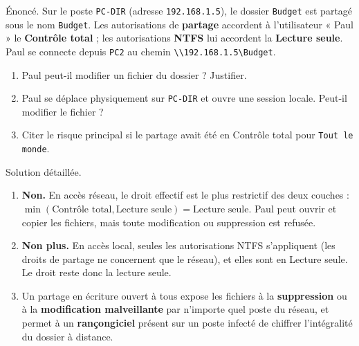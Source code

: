 \documentclass[11pt]{article}
\begin{document}
\begin{exoresolu}
Énoncé. Sur le poste \texttt{PC-DIR} (adresse \texttt{192.168.1.5}), le dossier \texttt{Budget} est partagé sous le nom \texttt{Budget}. Les autorisations de \textbf{partage} accordent à l'utilisateur « Paul » le \textbf{Contrôle total} ; les autorisations \textbf{NTFS} lui accordent la \textbf{Lecture seule}. Paul se connecte depuis \texttt{PC2} au chemin \texttt{\textbackslash\textbackslash 192.168.1.5\textbackslash Budget}.
\begin{enumerate}
  \item Paul peut-il modifier un fichier du dossier ? Justifier.
  \item Paul se déplace physiquement sur \texttt{PC-DIR} et ouvre une session locale. Peut-il modifier le fichier ?
  \item Citer le risque principal si le partage avait été en Contrôle total pour \texttt{Tout le monde}.
\end{enumerate}
\tcblower
Solution détaillée.
\begin{enumerate}
  \item \textbf{Non.} En accès réseau, le droit effectif est le plus restrictif des deux couches : $\min(\text{Contrôle total}, \text{Lecture seule}) = \text{Lecture seule}$. Paul peut ouvrir et copier les fichiers, mais toute modification ou suppression est refusée.
  \item \textbf{Non plus.} En accès local, seules les autorisations NTFS s'appliquent (les droits de partage ne concernent que le réseau), et elles sont en Lecture seule. Le droit reste donc la lecture seule.
  \item Un partage en écriture ouvert à tous expose les fichiers à la \textbf{suppression} ou à la \textbf{modification malveillante} par n'importe quel poste du réseau, et permet à un \textbf{rançongiciel} présent sur un poste infecté de chiffrer l'intégralité du dossier à distance.
\end{enumerate}
\end{exoresolu}
\end{document}

